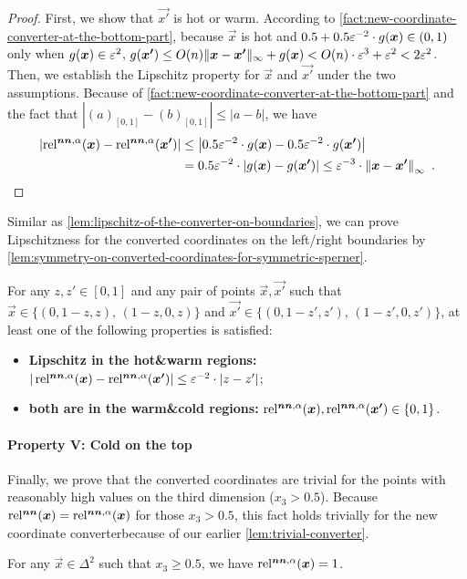 \begin{proof}
    First, we show that $\vec{x'}$ is hot or warm. According to \cref{fact:new-coordinate-converter-at-the-bottom-part}, because $\vec{x}$ is hot and $0.5+0.5\varepsilon^{-2}\cdot g(\boldsymbol{x})\in (0,1)$ only when $g(\boldsymbol{x})\in \varepsilon^2$, $g(\boldsymbol{x'})\leq O(n)\| {\boldsymbol{x}-\boldsymbol{x'}} \|_{\infty} + g(\boldsymbol{x}) < O(n)\cdot \varepsilon^{3} +\varepsilon^2 < 2\varepsilon^2$.
    Then, we establish the Lipschitz property for $\vec{x}$ and $\vec{x'}$ under the two assumptions. 
    Because of \cref{fact:new-coordinate-converter-at-the-bottom-part} and the fact that $|(a)_{[0,1]}-(b)_{[0,1]}| \leq |a-b|$, we have 
    \begin{align*}
        \left |{\operatorname*{rel^{\boldsymbol{nn},\alpha}}(\boldsymbol{x}) - \operatorname*{rel^{\boldsymbol{nn},\alpha}}(\boldsymbol{x'})} \right | &\leq
        \left |{ 0.5\varepsilon^{-2} \cdot g(\boldsymbol{x}) -   0.5\varepsilon^{-2} \cdot g(\boldsymbol{x'}) } \right |
        \\
        &=
        0.5\varepsilon^{-2} \cdot \left |{g(\boldsymbol{x})-g(\boldsymbol{x'})} \right |
        \leq \varepsilon^{-3} \cdot \left \| {\boldsymbol{x}-\boldsymbol{x'}} \right\|_{\infty}~.
        \qedhere
    \end{align*}
\end{proof}

Similar as \cref{lem:lipschitz-of-the-converter-on-boundaries}, we can prove Lipschitzness for the converted coordinates on the left/right boundaries by \cref{lem:symmetry-on-converted-coordinates-for-symmetric-sperner}.
\begin{lemma}
    \label{lem:lipschitz-of-the-converter-on-boundaries-for-symmetry}
    For any $z,z'\in [0,1]$ and any pair of points $\vec{x}, \vec{x'}$ such that $\vec{x}\in \{(0,1-z,z),\, (1-z,0,z)\}$ and $\vec{x'}\in \{(0,1-z',z'),\, (1-z',0,z')\}$, at least one of the following properties is satisfied:
    \begin{itemize}[itemsep=0em]
        \item {\bf Lipschitz in the hot\&warm regions:} $|\operatorname*{rel^{\boldsymbol{nn},\alpha}}(\boldsymbol{x})-\operatorname*{rel^{\boldsymbol{nn},\alpha}}(\boldsymbol{x'})|\leq \varepsilon^{-2}\cdot |z-z'|$; 
        \item {\bf both are in the warm\&cold regions:} $\operatorname*{rel^{\boldsymbol{nn},\alpha}}(\boldsymbol{x}),\operatorname*{rel^{\boldsymbol{nn},\alpha}}(\boldsymbol{x'})\in \{0,1\}$. 
    \end{itemize}
\end{lemma}

\paragraph{Property V: Cold on the top} 
Finally, we prove that the converted coordinates are trivial for the points with reasonably high values on the third dimension ($x_3>0.5$). 
Because $\operatorname*{rel^{\boldsymbol{nn}}}(\boldsymbol{x})=\operatorname*{rel^{\boldsymbol{nn},\alpha}}(\boldsymbol{x})$ for those $x_3>0.5$, this fact holds trivially for the new coordinate converterbecause of our earlier \cref{lem:trivial-converter}.
\begin{fact}
    \label{lem:trivial-converter-for-symmetry}
    For any $\vec{x}\in \Delta^{2}$ such that $x_3\geq 0.5$, we have $\operatorname*{rel^{\boldsymbol{nn},\alpha}}(\boldsymbol{x})=1$. 
\end{fact}

